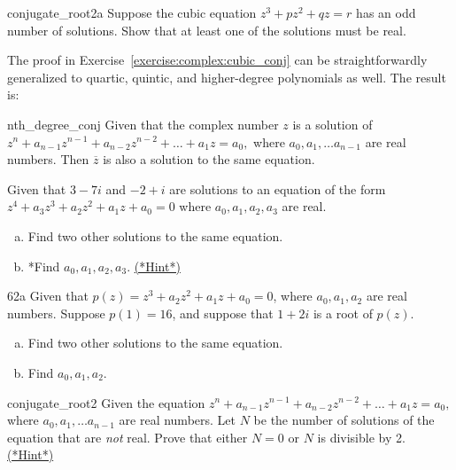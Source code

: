 \begin{exercise}{conjugate_root2a}
Suppose the cubic equation $z^3 + pz^2 + qz = r$ has an odd number of solutions. Show that at least one of the solutions must be real.
\end{exercise}


The proof in Exercise~\ref{exercise:complex:cubic_conj} can be straightforwardly generalized to quartic, quintic, and higher-degree polynomials as well. The result is:

\begin{prop}{nth_degree_conj}   Given that the complex number $z$ is a solution of $z^n + a_{n-1}z^{n-1} + a_{n-2} z^{n-2} + \ldots + a_1 z =a_0,$ where $a_0, a_1, \ldots a_{n-1}$ are real numbers. Then $\overline{z}$ is also a solution to the same equation. 
\end{prop}

\begin{exercise}{62} 
Given that $3 - 7i$ and $-2+i$ are solutions to an equation of the form $z^4 + a_{3}z^{3} + a_{2} z^{2}+ a_1 z + a_0 = 0$ where $a_0, a_1, a_2, a_3$ are real. 
\begin{enumerate}[(a)]
\item
Find two other solutions to the same equation.
\item
*Find $a_0, a_1, a_2, a_3$. 
\hyperref[sec:complex:hints]{(*Hint*)}
\end{enumerate}
\end{exercise}

\begin{exercise}{62a} 
Given that  $p(z) =z^3 +  a_{2} z^{2}+ a_1 z + a_0 = 0$, where $a_0, a_1, a_2$ are real numbers. Suppose $p(1) = 16$, and suppose that $1 + 2i$ is a root of $p(z)$.  
\begin{enumerate}[(a)]
\item
Find two other solutions to the same equation.
\item
Find $a_0, a_1, a_2$. 
\end{enumerate}
\end{exercise}

\begin{exercise}{conjugate_root2}
Given the equation  $z^n + a_{n-1}z^{n-1} + a_{n-2} z^{n-2} + \ldots + a_1 z =a_0,$ where $a_0, a_1, \ldots a_{n-1}$ are real numbers. Let $N$ be the number of solutions of the equation that are \emph{not} real. Prove that either $N=0$ or $N$ is divisible by 2. 
\hyperref[sec:complex:hints]{(*Hint*)}
\end{exercise}

